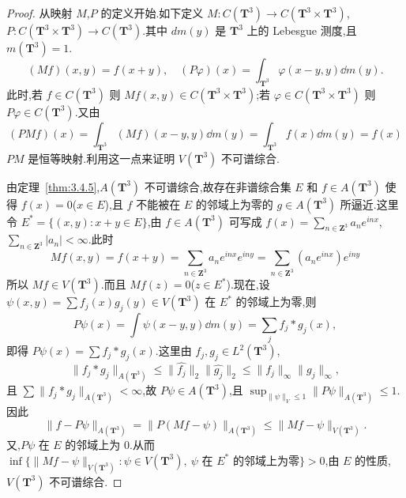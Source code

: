 \begin{proof}
从映射 $M$,$P$ 的定义开始.如下定义 $M: C(\mathbf{T}^{3}) \to C(\mathbf{T}^{3} \times \mathbf{T}^{3})$,$P: C(\mathbf{T}^{3} \times \mathbf{T}^{3}) \to C(\mathbf{T}^{3})$.其中 $dm(y)$ 是 $\mathbf{T}^{3}$ 上的 Lebesgue 测度,且 $m(\mathbf{T}^{3}) = 1$.
\begin{equation*}
(Mf)(x, y) = f(x + y), \quad (P\varphi)(x) = \int_{\mathbf{T}^{3}}\varphi(x - y, y)\dd m(y).
\end{equation*}
此时,若 $f \in C(\mathbf{T}^{3})$ 则 $Mf(x, y) \in C(\mathbf{T}^{3} \times \mathbf{T}^{3})$;若 $\varphi \in C(\mathbf{T}^{3} \times \mathbf{T}^{3})$ 则 $P\varphi \in C(\mathbf{T}^{3})$.又由
\begin{equation*}
(PMf)(x) = \int_{\mathbf{T}^{3}}(Mf)(x - y, y)\dd m(y) = \int_{\mathbf{T}^{3}}f(x)\dd m(y) = f(x)
\end{equation*}
$PM$ 是恒等映射.利用这一点来证明 $V(\mathbf{T}^{3})$ 不可谱综合.

由定理~\ref{thm:3.4.5},$A(\mathbf{T}^{3})$ 不可谱综合,故存在非谱综合集 $E$ 和 $f \in A(\mathbf{T}^{3})$ 使得 $f(x) = 0$($x \in E$),且 $f$ 不能被在 $E$ 的邻域上为零的 $g \in A(\mathbf{T}^{3})$ 所逼近.这里令 $E^{*} = \{(x, y): x + y \in E\}$,由 $f \in A(\mathbf{T}^{3})$ 可写成 $f(x) = \sum_{n \in \mathbf{Z}^{3}} a_{n}e^{inx}$,$\sum_{n \in \mathbf{Z}^{3}}|a_{n}| < \infty$.此时
\begin{equation*}
Mf(x, y) = f(x + y) = \sum_{n \in \mathbf{Z}^{3}}a_{n}e^{inx}e^{iny} = \sum_{n \in \mathbf{Z}^{3}}(a_{n}e^{inx})e^{iny}
\end{equation*}
所以 $Mf \in V(\mathbf{T}^{3})$.而且 $Mf(z) = 0$($z \in E^{*}$).现在,设 $\psi(x, y) = \sum f_{j}(x)g_{j}(y) \in V(\mathbf{T}^{3})$ 在 $E^{*}$ 的邻域上为零,则
\begin{equation*}
P\psi(x) = \int \psi(x - y, y)\dd m(y) = \sum_{j} f_{j} * g_{j}(x),
\end{equation*}
即得 $P\psi(x) = \sum f_{j} * g_{j}(x)$.这里由 $f_{j}, g_{j} \in L^{2}(\mathbf{T}^{3})$,
\begin{equation*}
\|f_{j} * g_{j}\|_{A(\mathbf{T}^{3})} \leq \|\widehat{f_{j}}\|_{2}\|\widehat{g_{j}}\|_{2} \leq \|f_{j}\|_{\infty}\|g_{j}\|_{\infty},
\end{equation*}
且 $\sum\|f_{j} * g_{j}\|_{A(\mathbf{T}^{3})} < \infty$,故 $P\psi \in A(\mathbf{T}^{3})$,且 $\sup_{\|\psi\|_{V} \leq 1}\|P\psi\|_{A(\mathbf{T}^{3})} \leq 1$.因此
\begin{equation*}
\|f - P\psi\|_{A(\mathbf{T}^{3})} = \|P(Mf - \psi)\|_{A(\mathbf{T}^{3})} \leq \|Mf - \psi\|_{V(\mathbf{T}^{3})}.
\end{equation*}
又,$P\psi$ 在 $E$ 的邻域上为 0.从而 $\inf\{\|Mf - \psi\|_{V(\mathbf{T}^{3})}: \psi \in V(\mathbf{T}^{3}),\ \psi \text{ 在 } E^{*} \text{ 的邻域上为零}\} > 0$,由 $E$ 的性质,$V(\mathbf{T}^{3})$ 不可谱综合.
\end{proof}

